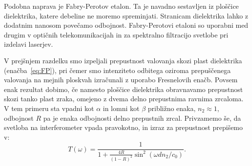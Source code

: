 Podobna naprava je Fabry-Perotov
etalon. Ta je navadno sestavljen iz ploščice dielektrika, katere debeline ne 
moremo spreminjati. Stranicam dielektrika lahko z dodatnim nanosom povečamo
odbojnost. Fabry-Perotovi etaloni so uporabni med drugim v optičnih 
telekomunikacijah in za spektralno filtracijo svetlobe pri izdelavi laserjev.

V prejšnjem razdelku smo izpeljali prepustnost valovanja skozi plast
dielektrika (enačba~\ref{eq:FP}), pri čemer smo intenziteto odbitega
oziroma prepuščenega valovanja na mejnih ploskvah izračunali z uporabo
Fresnelovih enačb. Povsem enak rezultat dobimo, če namesto ploščice 
dielektrika obravnavamo prepustnost skozi tanko plast zraka, omejeno
z dvema delno prepustnima ravnima zrcaloma. V tem primeru sta
vpadni kot $\alpha$ in lomni kot $\beta$  približno enaka, $n_2 \approx 1$,
odbojnost $R$ pa je enaka odbojnosti delno prepustnih zrcal. Privzamemo 
še, da svetloba na interferometer vpada pravokotno, in izraz za prepustnost
prepišemo v:
\begin{equation}
T(\omega) = \frac{1}{1 + \frac{4R}{\left(1-R\right)^2} \sin^2(\omega d n_2/c_0)}.
\label{eq:06_44}
\end{equation}

